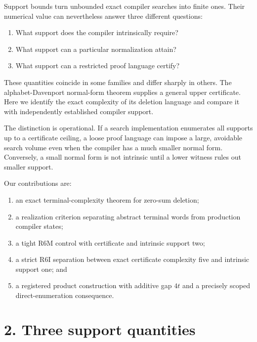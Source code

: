 \documentclass[
  11pt,
]{article}
\providecommand{\tightlist}{%
  \setlength{\itemsep}{0pt}\setlength{\parskip}{0pt}}
\begin{document}
Support bounds turn unbounded exact compiler searches into finite ones.
Their numerical value can nevertheless answer three different questions:

\begin{enumerate}
\def\labelenumi{\arabic{enumi}.}
\tightlist
\item
  What support does the compiler intrinsically require?
\item
  What support can a particular normalization attain?
\item
  What support can a restricted proof language certify?
\end{enumerate}

These quantities coincide in some families and differ sharply in others.
The alphabet-Davenport normal-form theorem supplies a general upper
certificate. Here we identify the exact complexity of its deletion
language and compare it with independently established compiler support.

The distinction is operational. If a search implementation enumerates
all supports up to a certificate ceiling, a loose proof language can
impose a large, avoidable search volume even when the compiler has a
much smaller normal form. Conversely, a small normal form is not
intrinsic until a lower witness rules out smaller support.

Our contributions are:

\begin{enumerate}
\def\labelenumi{\arabic{enumi}.}
\tightlist
\item
  an exact terminal-complexity theorem for zero-sum deletion;
\item
  a realization criterion separating abstract terminal words from
  production compiler states;
\item
  a tight R6M control with certificate and intrinsic support two;
\item
  a strict R6I separation between exact certificate complexity five and
  intrinsic support one; and
\item
  a registered product construction with additive gap \(4t\) and a
  precisely scoped direct-enumeration consequence.
\end{enumerate}

\hypertarget{three-support-quantities}{%
\section{2. Three support quantities}\label{three-support-quantities}}
\end{document}
